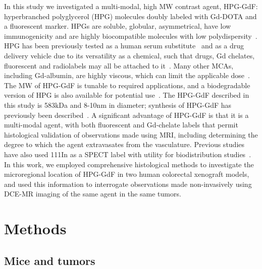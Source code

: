 In this study we investigated a multi-modal, high MW contrast agent, HPG-GdF: hyperbranched polyglycerol (HPG) molecules doubly labeled with Gd-DOTA and a fluorescent marker.
HPGs are soluble, globular, asymmetrical, have low immunogenicity and are highly biocompatible molecules with low polydispersity~\cite{Saatchi:2012hc,Kainthan:2006ce,Saatchi:2012gc}.
HPG has been previously tested as a human serum substitute~\cite{Kainthan:2008ek} and as a drug delivery vehicle due to its versatility as a chemical, such that drugs, Gd chelates, fluorescent and radiolabels may all be attached to it~\cite{Shenoi:2013id}.
Many other MCAs, including Gd-albumin, are highly viscous, which can limit the applicable dose~\cite{Imranulhaq:2012ij}.
The MW of HPG-GdF is tunable to required applications, and a biodegradable version of HPG is also available for potential use~\cite{Shenoi:2013id}.
The HPG-GdF described in this study is 583kDa and 8-10nm in diameter; synthesis of HPG-GdF has previously been described~\cite{Saatchi:2012hc}.
A significant advantage of HPG-GdF is that it is a multi-modal agent, with both fluorescent and Gd-chelate labels that permit histological validation of observations made using MRI, including determining the degree to which the agent extravasates from the vasculature.
Previous studies have also used 111In as a SPECT label with utility for biodistribution studies~\cite{Saatchi:2012hc}.
In this work, we employed comprehensive histological methods to investigate the microregional location of HPG-GdF in two human colorectal xenograft models, and used this information to interrogate observations made non-invasively using DCE-MR imaging of the same agent in the same tumors.

\section{Methods}

\subsection{Mice and tumors}

